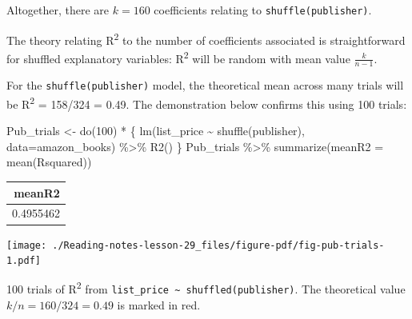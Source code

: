 \documentclass[
  letterpaper,
  DIV=11,
  numbers=noendperiod,
  oneside]{scrreprt}
\newenvironment{Shaded}{\begin{snugshade}}{\end{snugshade}}
\newcommand{\AttributeTok}[1]{\textcolor[rgb]{0.40,0.45,0.13}{#1}}
\newcommand{\DecValTok}[1]{\textcolor[rgb]{0.68,0.00,0.00}{#1}}
\newcommand{\FunctionTok}[1]{\textcolor[rgb]{0.28,0.35,0.67}{#1}}
\newcommand{\NormalTok}[1]{\textcolor[rgb]{0.00,0.23,0.31}{#1}}
\newcommand{\OtherTok}[1]{\textcolor[rgb]{0.00,0.23,0.31}{#1}}
\newcommand{\SpecialCharTok}[1]{\textcolor[rgb]{0.37,0.37,0.37}{#1}}
\begin{document}
\begin{tcolorbox}
Altogether, there are \(k=160\) coefficients relating to
\texttt{shuffle(publisher)}.

\end{tcolorbox}

The theory relating R\textsuperscript{2} to the number of coefficients
associated is straightforward for shuffled explanatory variables:
R\textsuperscript{2} will be random with mean value \(\frac{k}{n-1}\).

\begin{tcolorbox}[enhanced jigsaw, colbacktitle=quarto-callout-warning-color!10!white, breakable, opacitybacktitle=0.6, colback=white, left=2mm, arc=.35mm, colframe=quarto-callout-warning-color-frame, coltitle=black, toprule=.15mm, opacityback=0, leftrule=.75mm, bottomtitle=1mm, toptitle=1mm, titlerule=0mm, title=\textcolor{quarto-callout-warning-color}{\faExclamationTriangle}\hspace{0.5em}{Demonstration: The mean R\textsuperscript{2} across many trials}, rightrule=.15mm, bottomrule=.15mm]

For the \texttt{shuffle(publisher)} model, the theoretical mean across
many trials will be R\textsuperscript{2} = 158/324 = 0.49. The
demonstration below confirms this using 100 trials:

\begin{Shaded}
\begin{Highlighting}[]
\NormalTok{Pub\_trials }\OtherTok{\textless{}{-}} \FunctionTok{do}\NormalTok{(}\DecValTok{100}\NormalTok{) }\SpecialCharTok{*}\NormalTok{ \{}
  \FunctionTok{lm}\NormalTok{(list\_price }\SpecialCharTok{\textasciitilde{}} \FunctionTok{shuffle}\NormalTok{(publisher), }\AttributeTok{data=}\NormalTok{amazon\_books) }\SpecialCharTok{\%\textgreater{}\%}
    \FunctionTok{R2}\NormalTok{()}
\NormalTok{\}}
\NormalTok{Pub\_trials }\SpecialCharTok{\%\textgreater{}\%} \FunctionTok{summarize}\NormalTok{(}\AttributeTok{meanR2 =} \FunctionTok{mean}\NormalTok{(Rsquared))}
\end{Highlighting}
\end{Shaded}

\ttfamily 
\begin{tabular}{r}
\toprule
meanR2\\
\midrule
0.4955462\\
\bottomrule
\end{tabular} \normalfont
\bigskip

\end{tcolorbox}

\begin{marginfigure}

{\centering \texttt{[image: ./Reading-notes-lesson-29\_files/figure-pdf/fig-pub-trials-1.pdf]}

}

\caption{\label{fig-pub-trials}100 trials of R\textsuperscript{2} from
\texttt{list\_price\ \textasciitilde{}\ shuffled(publisher)}. The
theoretical value \(k/n=160/324=0.49\) is marked in red.}

\end{marginfigure}
\end{document}
